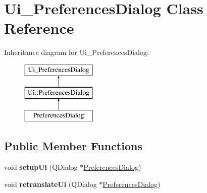 \hypertarget{class_ui___preferences_dialog}{}\section{Ui\+\_\+\+Preferences\+Dialog Class Reference}
\label{class_ui___preferences_dialog}
Inheritance diagram for Ui\+\_\+\+Preferences\+Dialog\+:\begin{figure}[H]
\begin{center}
\leavevmode
\includegraphics[height=3.000000cm]{class_ui___preferences_dialog}
\end{center}
\end{figure}
\subsection*{Public Member Functions}
\begin{DoxyCompactItemize}
\item 
void {\bfseries setup\+Ui} (Q\+Dialog $\ast$\hyperlink{class_preferences_dialog}{Preferences\+Dialog})\hypertarget{class_ui___preferences_dialog_ab2433bec54af4eb2a64c32241b994e6d}{}\label{class_ui___preferences_dialog_ab2433bec54af4eb2a64c32241b994e6d}

\item 
void {\bfseries retranslate\+Ui} (Q\+Dialog $\ast$\hyperlink{class_preferences_dialog}{Preferences\+Dialog})\hypertarget{class_ui___preferences_dialog_a05504e552435cca6485e5ee3a42ffe78}{}\label{class_ui___preferences_dialog_a05504e552435cca6485e5ee3a42ffe78}

\end{DoxyCompactItemize}

